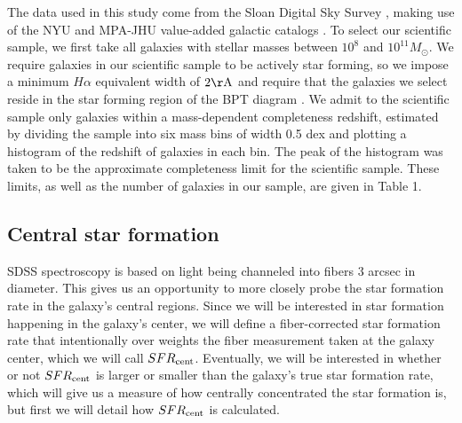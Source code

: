 \documentclass[iop]{emulateapj}
\begin{document}
The data used in this study come from the Sloan Digital Sky Survey \citep[SDSS,][]{SDSS}, making use of the NYU and MPA-JHU value-added galactic catalogs \citep{Kauffmann03,Brinchmann04,blanton05vagc}. To select our scientific sample, we first take all galaxies with stellar masses between $10^{8}$ and $10^{11} M_{\odot}$. We require galaxies in our scientific sample to be actively star forming, so we impose a minimum $H\alpha$ equivalent width of $2 \rm \AA$ and require that the galaxies we select reside in the star forming region of the BPT diagram \citep{BPT}. We admit to the scientific sample only galaxies within a mass-dependent completeness redshift, estimated by dividing the sample into six mass bins of width 0.5 dex and plotting a histogram of the redshift of galaxies in each bin. The peak of the histogram was taken to be the approximate completeness limit for the scientific sample. These limits, as well as the number of galaxies in our sample, are given in Table 1.


\subsection{Central star formation}
\label{sec:fibercor}
SDSS spectroscopy is based on light being channeled into fibers $3$ arcsec in diameter. This gives us an opportunity to more closely probe the star formation rate in the galaxy's central regions. Since we will be interested in star formation happening in the galaxy's center, we will define a fiber-corrected star formation rate that intentionally over weights the fiber measurement taken at the galaxy center, which we will call $SFR_{\rm cent}$. Eventually, we will be interested in whether or not $SFR_{\rm cent}$ is larger or smaller than the galaxy's true star formation rate, which will give us a measure of how centrally concentrated the star formation is, but first we will detail how $SFR_{\rm cent}$ is calculated.
\end{document}
